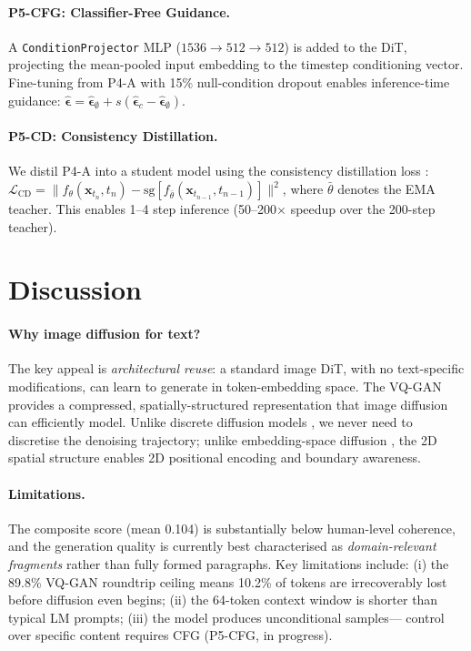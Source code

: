 \documentclass[11pt,a4paper]{article}
\begin{document}
\paragraph{P5-CFG: Classifier-Free Guidance.}
A \texttt{ConditionProjector} MLP ($1536\to512\to512$) is added to the DiT, projecting
the mean-pooled input embedding to the timestep conditioning vector.
Fine-tuning from P4-A with 15\% null-condition dropout \citep{ho2022cfg} enables
inference-time guidance:
$\hat{\boldsymbol{\epsilon}} = \hat{\boldsymbol{\epsilon}}_\emptyset + s(\hat{\boldsymbol{\epsilon}}_c - \hat{\boldsymbol{\epsilon}}_\emptyset)$.

\paragraph{P5-CD: Consistency Distillation.}
We distil P4-A into a student model using the consistency distillation loss
\citep{song2023consistency}:
$\mathcal{L}_{\text{CD}} = \| f_\theta(\mathbf{x}_{t_n}, t_n) -
\text{sg}[f_{\bar\theta}(\mathbf{x}_{t_{n-1}}, t_{n-1})] \|^2$,
where $\bar\theta$ denotes the EMA teacher.
This enables 1--4 step inference (50--200$\times$ speedup over the 200-step teacher).


\section{Discussion}
\label{sec:discussion}

\paragraph{Why image diffusion for text?}
The key appeal is \emph{architectural reuse}: a standard image DiT, with no
text-specific modifications, can learn to generate in token-embedding space.
The VQ-GAN provides a compressed, spatially-structured representation that
image diffusion can efficiently model.
Unlike discrete diffusion models \citep{austin2021d3pm}, we never need to discretise
the denoising trajectory; unlike embedding-space diffusion \citep{li2022diffusionlm},
the 2D spatial structure enables 2D positional encoding and boundary awareness.

\paragraph{Limitations.}
The composite score (mean 0.104) is substantially below human-level coherence, and
the generation quality is currently best characterised as \emph{domain-relevant fragments}
rather than fully formed paragraphs.
Key limitations include: (i) the 89.8\% VQ-GAN roundtrip ceiling means 10.2\% of tokens
are irrecoverably lost before diffusion even begins; (ii) the 64-token context window
is shorter than typical LM prompts; (iii) the model produces unconditional samples---
control over specific content requires CFG (P5-CFG, in progress).
\end{document}
